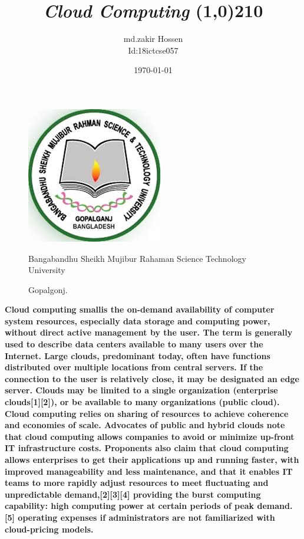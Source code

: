 \documentclass[11pt]{article}
\begin{document}
\pagecolor{gray}
\begin{Huge}
\title{\color{green}\textit{\Huge\bfseries Cloud Computing }\line(1,0){210}}
\author{\color{black} md.zakir Hossen\\
Id:18ictcse057}
\date{\color{black} \today}
\end{Huge}
\maketitle
\begin{figure}
\begin{center}

\includegraphics[scale=.2]{a1.jpg}
\begin{center}
Bangabandhu Sheikh Mujibur Rahaman Science  Technology University

Gopalgonj.
 \end{center}
\end{center}
\end{figure}
\newpage
\bfseries{\color{cyan}Cloud computing} smallis the on-demand availability of computer system resources, especially data storage and computing power, without direct active management by the user. The term is generally used to describe data centers available to many users over the Internet. Large clouds, predominant today, often have functions distributed over multiple locations from central servers. If the connection to the user is relatively close, it may be designated an edge server.
Clouds may be limited to a single organization (enterprise clouds[1][2]), or be available to many organizations (public cloud).
Cloud computing relies on sharing of resources to achieve coherence and economies of scale.
Advocates of public and hybrid clouds note that cloud computing allows companies to avoid or minimize up-front IT infrastructure costs. Proponents also claim that cloud computing allows enterprises to get their applications up and running faster, with improved manageability and less maintenance, and that it enables IT teams to more rapidly adjust resources to meet fluctuating and unpredictable demand,[2][3][4] providing the burst computing capability: high computing power at certain periods of peak demand.[5] operating expenses if administrators are not familiarized with cloud-pricing models.
\end{document}
